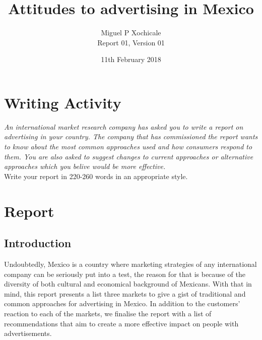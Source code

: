 \documentclass[10pt]{article}
\title{Attitudes to advertising in Mexico}
\author{Miguel P Xochicale \\
Report 01, Version 01}
\date{11th February 2018}
\begin{document}
\maketitle
\thispagestyle{empty} %


\section{Writing Activity}
\textit{
An international market research company has asked you to write a report
on advertising in your country. The company that has commissioned the 
report wants to know about the most common approaches used and how 
consumers respond to them. You are also asked to suggest changes to 
current approaches or alternative approaches which you belive would
be more effective.
}
\\
Write your report in 220-260 words in an appropriate style.

\section{Report}
\subsection{Introduction}

Undoubtedly, Mexico is a country where marketing strategies of any 
international company can be seriously put into a test, the reason for that
is because of the diversity of both cultural and economical background of 
Mexicans. With that in mind, this report presents a list three markets 
to give a gist of traditional and common approaches for advertising
in Mexico. 
In addition to the customers' reaction to each of the markets, 
we finalise the report with a list of  recommendations that aim 
to create a more effective impact on people with advertisements.

\end{document}
